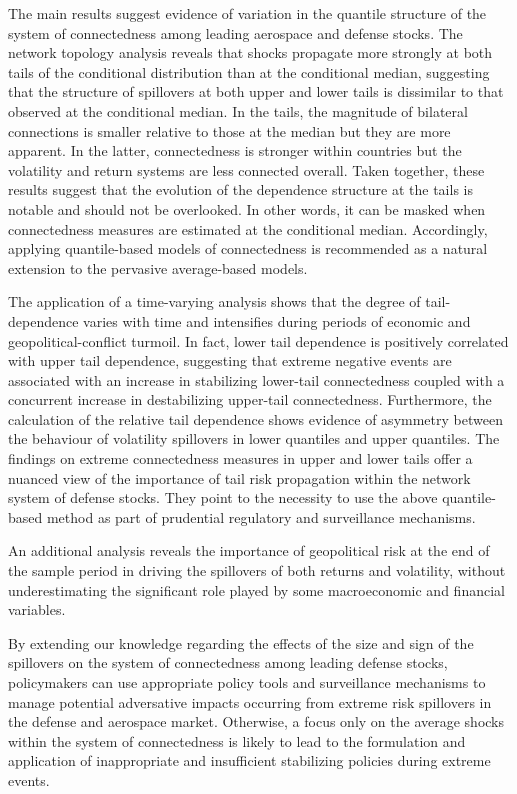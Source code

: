 \documentclass[
  letterpaper,
  DIV=11,
  numbers=noendperiod]{scrartcl}
\begin{document}
The main results suggest evidence of variation in the quantile structure
of the system of connectedness among leading aerospace and defense
stocks. The network topology analysis reveals that shocks propagate more
strongly at both tails of the conditional distribution than at the
conditional median, suggesting that the structure of spillovers at both
upper and lower tails is dissimilar to that observed at the conditional
median. In the tails, the magnitude of bilateral connections is smaller
relative to those at the median but they are more apparent. In the
latter, connectedness is stronger within countries but the volatility
and return systems are less connected overall. Taken together, these
results suggest that the evolution of the dependence structure at the
tails is notable and should not be overlooked. In other words, it can be
masked when connectedness measures are estimated at the conditional
median. Accordingly, applying quantile-based models of connectedness is
recommended as a natural extension to the pervasive average-based
models.

The application of a time-varying analysis shows that the degree of
tail-dependence varies with time and intensifies during periods of
economic and geopolitical-conflict turmoil. In fact, lower tail
dependence is positively correlated with upper tail dependence,
suggesting that extreme negative events are associated with an increase
in stabilizing lower-tail connectedness coupled with a concurrent
increase in destabilizing upper-tail connectedness. Furthermore, the
calculation of the relative tail dependence shows evidence of asymmetry
between the behaviour of volatility spillovers in lower quantiles and
upper quantiles. The findings on extreme connectedness measures in upper
and lower tails offer a nuanced view of the importance of tail risk
propagation within the network system of defense stocks. They point to
the necessity to use the above quantile-based method as part of
prudential regulatory and surveillance mechanisms.

An additional analysis reveals the importance of geopolitical risk at
the end of the sample period in driving the spillovers of both returns
and volatility, without underestimating the significant role played by
some macroeconomic and financial variables.

By extending our knowledge regarding the effects of the size and sign of
the spillovers on the system of connectedness among leading defense
stocks, policymakers can use appropriate policy tools and surveillance
mechanisms to manage potential adversative impacts occurring from
extreme risk spillovers in the defense and aerospace market. Otherwise,
a focus only on the average shocks within the system of connectedness is
likely to lead to the formulation and application of inappropriate and
insufficient stabilizing policies during extreme events.
\end{document}
